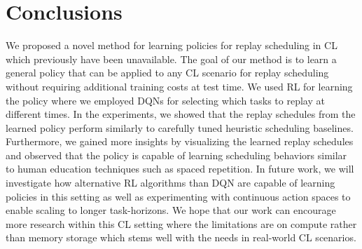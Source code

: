 
\section{Conclusions}\label{paperD:sec:conclusions}

We proposed a novel method for learning policies for replay scheduling in CL which previously have been unavailable. The goal of our method is to learn a general policy that can be applied to any CL scenario for replay scheduling without requiring additional training costs at test time. We used RL for learning the policy where we employed DQNs for selecting which tasks to replay at different times. In the experiments, we showed that the replay schedules from the learned policy perform similarly to carefully tuned heuristic scheduling baselines. Furthermore, we gained more insights by visualizing the learned replay schedules and observed that the policy is capable of learning scheduling behaviors similar to human education techniques such as spaced repetition. In future work, we will investigate how alternative RL algorithms than DQN are capable of learning policies in this setting as well as experimenting with continuous action spaces to enable scaling to longer task-horizons. We hope that our work can encourage more research within this CL setting where the limitations are on compute rather than memory storage which stems well with the needs in real-world CL scenarios.  

